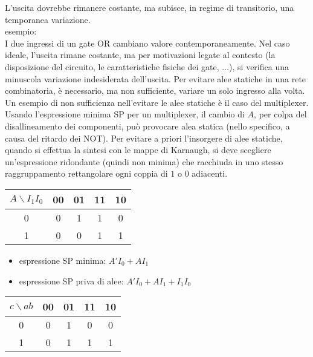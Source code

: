 \documentclass{subfiles}
\begin{document}
L'uscita dovrebbe rimanere costante, ma subisce, in regime di transitorio, una temporanea variazione.\\

\noindent
esempio:\\

\noindent
I due ingressi di un gate OR cambiano valore contemporaneamente.
Nel caso ideale, l'uscita rimane costante, ma per motivazioni legate al contesto (la disposizione del circuito, le caratteristiche fisiche dei gate, $\dots$), si verifica una minuscola variazione indesiderata dell'uscita.
Per evitare alee statiche in una rete combinatoria, è necessario, ma non sufficiente, variare un solo ingresso alla volta.
Un esempio di non sufficienza nell'evitare le alee statiche è il caso del multiplexer.
Usando l'espressione minima SP per un multiplexer, il cambio di $A$, per colpa del disallineamento dei componenti, può provocare alea statica (nello specifico, a causa del ritardo dei NOT).
Per evitare a priori l'insorgere di alee statiche, quando si effettua la sintesi con le mappe di Karnaugh, si deve scegliere un'espressione ridondante (quindi non minima) che racchiuda in uno stesso raggruppamento rettangolare ogni coppia di $1$ o $0$ adiacenti.\\

\begin{center}
\begin{tabular}{ |c|c|c|c|c| }
\hline
$A \backslash I_1I_0$ & 00 & 01 & 11 & 10 \\
\hline
\hline
0 & 0 & 1 & 1 & 0 \\
1 & 0 & 0 & 1 & 1 \\
\hline
\end{tabular}
\end{center}

\begin{itemize}
    \item espressione SP minima: $A'I_0 + AI_1$
    \item espressione SP priva di alee: $A'I_0 + AI_1 + I_1I_0$
\end{itemize}

\begin{center}
\begin{tabular}{ |c|c|c|c|c| }
\hline
$c \backslash ab$ & 00 & 01 & 11 & 10 \\
\hline
\hline
0 & 0 & 1 & 0 & 0 \\
1 & 0 & 1 & 1 & 1 \\
\hline
\end{tabular}
\end{center}
\end{document}
